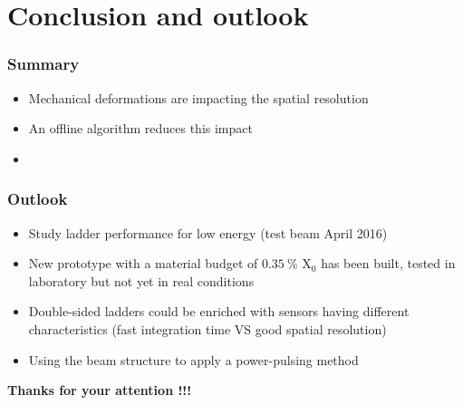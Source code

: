 \documentclass{beamer}
\begin{document}
    
  \section{Conclusion and outlook} 

  \begin{frame}
    \frametitle{Summary}

    \begin{itemize}
      \item Mechanical deformations are impacting the spatial resolution
      \item An offline algorithm reduces this impact
      \item 
    \end{itemize}

  \end{frame}

  \begin{frame}
    \frametitle{Outlook}

    \begin{itemize}
      \item Study ladder performance for low energy (test beam April 2016)
      \item New prototype with a material budget of $0.35~\%$ X$_0$ has been built, tested in laboratory but not yet in real conditions
      \item Double-sided ladders could be enriched with sensors having different characteristics (fast integration time VS good spatial resolution)
      \item Using the beam structure to apply a power-pulsing method
    \end{itemize}

  \end{frame}

  \begin{frame}
    \begin{center}
      \huge
      \textbf{Thanks for your attention !!!}
    \end{center}
  \end{frame}

  \appendix
  \setcounter{lastframe}{\insertframenumber}
\end{document}
